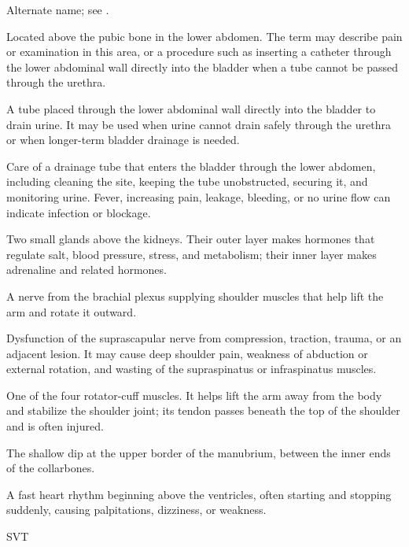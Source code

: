  Alternate name; see .

 Located above the pubic bone in the lower abdomen. The term may describe pain or examination in this area, or a procedure such as inserting a catheter through the lower abdominal wall directly into the bladder when a tube cannot be passed through the urethra.

 A tube placed through the lower abdominal wall directly into the bladder to drain urine. It may be used when urine cannot drain safely through the urethra or when longer-term bladder drainage is needed.

 Care of a drainage tube that enters the bladder through the lower abdomen, including cleaning the site, keeping the tube unobstructed, securing it, and monitoring urine. Fever, increasing pain, leakage, bleeding, or no urine flow can indicate infection or blockage.

 Two small glands above the kidneys. Their outer layer makes hormones that regulate salt, blood pressure, stress, and metabolism; their inner layer makes adrenaline and related hormones.

 A nerve from the brachial plexus supplying shoulder muscles that help lift the arm and rotate it outward.

 Dysfunction of the suprascapular nerve from compression, traction, trauma, or an adjacent lesion. It may cause deep shoulder pain, weakness of abduction or external rotation, and wasting of the supraspinatus or infraspinatus muscles.

 One of the four rotator-cuff muscles. It helps lift the arm away from the body and stabilize the shoulder joint; its tendon passes beneath the top of the shoulder and is often injured.

 The shallow dip at the upper border of the manubrium, between the inner ends of the collarbones.

 A fast heart rhythm beginning above the ventricles, often starting and stopping suddenly, causing palpitations, dizziness, or weakness.


\synonyms
SVT


